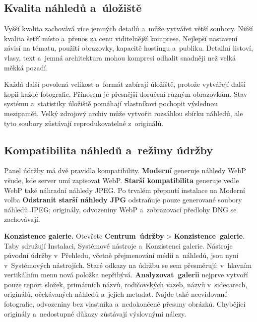 \documentclass[11pt,a4paper]{article}
\newcommand{\ui}[1]{\textbf{#1}}
\begin{document}
\subsection{Kvalita náhledů a~úložiště}

Vyšší kvalita zachovává více jemných detailů a~může vytvářet větší soubory.
Nižší kvalita šetří místo a~přenos za cenu viditelnější komprese. Nejlepší
nastavení závisí na tématu, použití obrazovky, kapacitě hostingu a~publiku.
Detailní listoví, vlasy, text a~jemná architektura mohou kompresi odhalit
snadněji než velká měkká pozadí.

Každá další povolená velikost a~formát zabírají úložiště, protože vytvářejí
další kopii každé fotografie. Přínosem je přesnější doručení různým obrazovkám.
Stav systému a~statistiky úložiště pomáhají vlastníkovi pochopit výslednou
mezipaměť. Velký zdrojový archiv může vytvořit rozsáhlou sbírku náhledů, ale
tyto soubory zůstávají reprodukovatelné z~originálů.

\subsection{Kompatibilita náhledů a~režimy údržby}

Panel údržby má dvě pravidla kompatibility. \ui{Moderní} generuje náhledy WebP
všude, kde server umí zapisovat WebP. \ui{Starší kompatibilita} generuje vedle
WebP také náhradní náhledy JPEG. Po trvalém přepnutí instalace na Moderní volba
\ui{Odstranit starší náhledy JPG} odstraňuje pouze generované soubory náhledů
JPEG; originály, odvozeniny WebP a~zobrazovací předlohy DNG se zachovávají.

\textbf{Konzistence galerie.} Otevřete \ui{Centrum~údržby} >
\ui{Konzistence~galerie}. Taby sdružují Instalaci, Systémové nástroje
a~Konzistenci galerie. Nástroje původní údržby v~Přehledu, včetně přejmenování
médií a~náhledů, jsou nyní v~Systémových nástrojích. Staré odkazy na údržbu se
sem přesměrují; v~hlavním vertikálním menu nová položka nepřibývá.
\ui{Analyzovat~galerii} nejprve vytvoří pouze report složek, primárních názvů,
rodičovských vazeb, názvů v~sidecarech, originálů, očekávaných náhledů
a~jejich metadat. Najde také neevidované fotografie, odvozeniny bez vlastníka
a~nedokončené přesuny obrázků. Chybějící originály a~nedostupné důkazy
zůstávají výslovnými nálezy.
\end{document}
